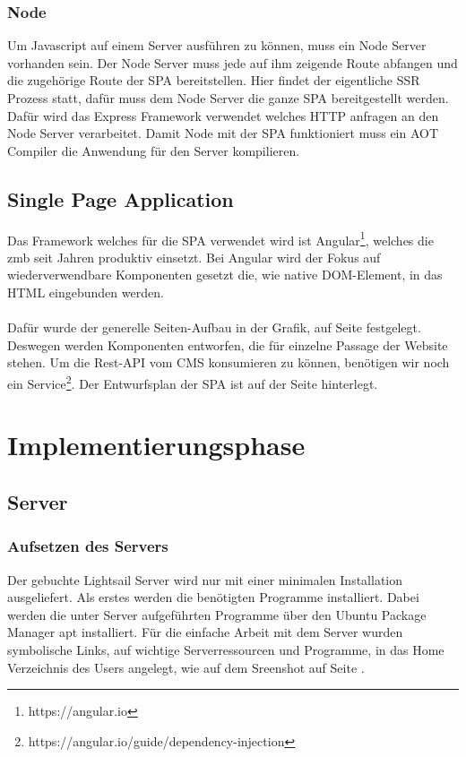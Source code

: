 \documentclass[11pt,a4paper]{article}
\begin{document}
\subsubsection{Node}
Um Javascript auf einem Server ausführen zu können, muss ein Node Server vorhanden sein.
Der Node Server muss jede auf ihm zeigende Route abfangen und die zugehörige Route der SPA bereitstellen. Hier findet der eigentliche SSR Prozess statt, dafür muss dem Node Server die ganze SPA bereitgestellt werden. Dafür wird das Express Framework verwendet welches HTTP anfragen an den Node Server verarbeitet. Damit Node mit der SPA funktioniert muss ein AOT Compiler die Anwendung für den Server kompilieren.
\subsection{Single Page Application}
Das Framework welches für die SPA verwendet wird ist Angular\footnote{https://angular.io}, welches die zmb seit Jahren produktiv einsetzt. Bei Angular wird der Fokus auf wiederverwendbare Komponenten gesetzt die, wie native DOM-Element, in das HTML eingebunden werden.\\\\
Dafür wurde der generelle Seiten-Aufbau in der Grafik, auf Seite \pageref{sec:epage} 
festgelegt. Deswegen werden Komponenten entworfen, die für einzelne Passage der Website stehen. 
Um die Rest-API vom CMS  konsumieren zu können, benötigen wir noch ein Service\footnote{https://angular.io/guide/dependency-injection}. 
Der Entwurfsplan der SPA ist auf der Seite \pageref{sec:espa} hinterlegt.
\section{Implementierungsphase}
\subsection{Server}
\subsubsection{Aufsetzen des Servers}
Der gebuchte Lightsail Server wird nur mit einer minimalen Installation ausgeliefert. Als erstes werden die benötigten Programme installiert. Dabei werden die unter Server aufgeführten Programme über den Ubuntu Package Manager apt installiert. Für die einfache Arbeit mit dem Server wurden symbolische Links, auf wichtige Serverressourcen und Programme, in das Home Verzeichnis des Users angelegt, wie auf dem Sreenshot auf Seite \pageref{sec:ordner} .
\end{document}
